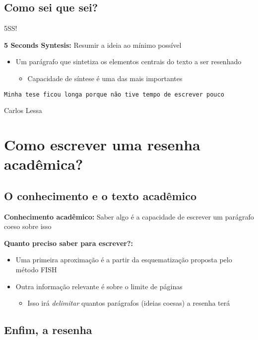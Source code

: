 \documentclass[11pt]{article}
\begin{document}
\subsection*{Como sei que sei?}
\label{sec:org88b38ac}

5SS!

\textbf{5 Seconds Syntesis:} Resumir a ideia ao mínimo possível

\begin{itemize}
\item Um parágrafo que sintetiza os elementos centrais do texto a ser resenhado
\begin{itemize}
\item Capacidade de síntese é uma das mais importantes
\end{itemize}
\end{itemize}

\begin{NOTES}
\texttt{Minha tese ficou longa porque não tive tempo de escrever pouco}

Carlos Lessa
\end{NOTES}

\section*{Como escrever uma resenha acadêmica?}
\label{sec:org424747e}

\subsection*{O conhecimento e o texto acadêmico}
\label{sec:orgd8167ec}

\textbf{Conhecimento acadêmico:} Saber algo é a capacidade de escrever um parágrafo coeso sobre isso


\textbf{Quanto preciso saber para escrever?:}

\begin{itemize}
\item Uma primeira aproximação é a partir da esquematização proposta pelo método FISH
\item Outra informação relevante é sobre o limite de páginas
\begin{itemize}
\item Isso irá \emph{delimitar} quantos parágrafos (ideias coesas) a resenha terá
\end{itemize}
\end{itemize}


\subsection*{Enfim, a resenha}
\label{sec:orge23b908}
\end{document}
